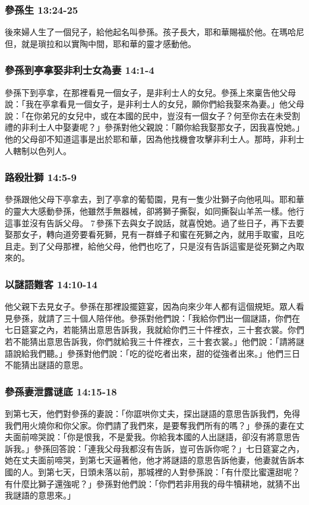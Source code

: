 \subsubsection{參孫生 13:24-25}
後來婦人生了一個兒子，給他起名叫參孫。孩子長大，耶和華賜福於他。在瑪哈尼但，就是瑣拉和以實陶中間，耶和華的靈才感動他。

\subsubsection{參孫到亭拿娶非利士女為妻 14:1-4}
參孫下到亭拿，在那裡看見一個女子，是非利士人的女兒。參孫上來稟告他父母說：「我在亭拿看見一個女子，是非利士人的女兒，願你們給我娶來為妻。」他父母說：「在你弟兄的女兒中，或在本國的民中，豈沒有一個女子？何至你去在未受割禮的非利士人中娶妻呢？」參孫對他父親說：「願你給我娶那女子，因我喜悅她。」他的父母卻不知道這事是出於耶和華，因為他找機會攻擊非利士人。那時，非利士人轄制以色列人。

\subsubsection{路殺壯獅 14:5-9}
參孫跟他父母下亭拿去，到了亭拿的葡萄園，見有一隻少壯獅子向他吼叫。耶和華的靈大大感動參孫，他雖然手無器械，卻將獅子撕裂，如同撕裂山羊羔一樣。他行這事並沒有告訴父母。 7 參孫下去與女子說話，就喜悅她。過了些日子，再下去要娶那女子，轉向道旁要看死獅，見有一群蜂子和蜜在死獅之內，就用手取蜜，且吃且走。到了父母那裡，給他父母，他們也吃了，只是沒有告訴這蜜是從死獅之內取來的。

\subsubsection{以謎語難客 14:10-14}
他父親下去見女子。參孫在那裡設擺筵宴，因為向來少年人都有這個規矩。眾人看見參孫，就請了三十個人陪伴他。參孫對他們說：「我給你們出一個謎語，你們在七日筵宴之內，若能猜出意思告訴我，我就給你們三十件裡衣，三十套衣裳。你們若不能猜出意思告訴我，你們就給我三十件裡衣，三十套衣裳。」他們說：「請將謎語說給我們聽。」參孫對他們說：「吃的從吃者出來，甜的從強者出來。」他們三日不能猜出謎語的意思。

\subsubsection{參孫妻泄露谜底 14:15-18}
到第七天，他們對參孫的妻說：「你誆哄你丈夫，探出謎語的意思告訴我們，免得我們用火燒你和你父家。你們請了我們來，是要奪我們所有的嗎？」參孫的妻在丈夫面前啼哭說：「你是恨我，不是愛我。你給我本國的人出謎語，卻沒有將意思告訴我。」參孫回答說：「連我父母我都沒有告訴，豈可告訴你呢？」七日筵宴之內，她在丈夫面前啼哭，到第七天逼著他，他才將謎語的意思告訴他妻，他妻就告訴本國的人。到第七天，日頭未落以前，那城裡的人對參孫說：「有什麼比蜜還甜呢？有什麼比獅子還強呢？」參孫對他們說：「你們若非用我的母牛犢耕地，就猜不出我謎語的意思來。」

